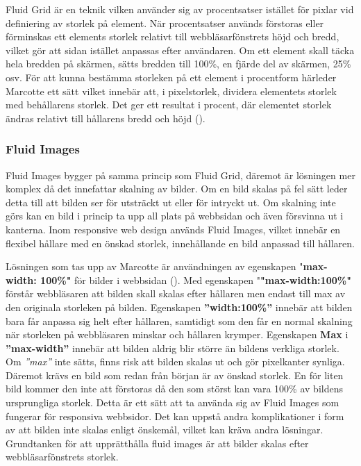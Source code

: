 \documentclass[11pt]{article}
\begin{document}
Fluid Grid är en teknik vilken använder sig av procentsatser istället för pixlar vid definiering av storlek på element. När procentsatser används förstoras eller förminskas ett elements storlek relativt till webbläsarfönstrets höjd och bredd, vilket gör att sidan istället anpassas efter användaren. Om ett element skall täcka hela bredden på skärmen, sätts bredden till 100\%, en fjärde del av skärmen, 25\% osv. 
För att kunna bestämma storleken på ett element i procentform härleder Marcotte ett sätt vilket innebär att, i pixelstorlek, dividera elementets storlek med behållarens storlek. Det ger ett resultat i procent, där elementet storlek ändras relativt till hållarens bredd och höjd (\cite[s. 23]{resp}).

\subsubsection{Fluid Images}
Fluid Images bygger på samma princip som Fluid Grid, däremot är lösningen mer komplex då det innefattar skalning av bilder. Om en bild skalas på fel sätt leder detta till att bilden ser för utsträckt ut eller för intryckt ut. Om skalning inte görs kan en bild i princip ta upp all plats på webbsidan och även försvinna ut i kanterna. Inom responsive web design används Fluid Images, vilket innebär en flexibel hållare med en önskad storlek, innehållande en bild anpassad till hållaren.  

Lösningen som tas upp av Marcotte är användningen av egenskapen "\textbf{max-width: 100\%"} för bilder i webbsidan (\cite[s. 45]{resp}). Med egenskapen "\textbf{"max-width:100\%"}  förstår webbläsaren att bilden skall skalas efter hållaren men endast till max av den originala storleken på bilden. Egenskapen \textbf{”width:100\%”} innebär att bilden bara får anpassa sig helt efter hållaren, samtidigt som den får en normal skalning när storleken på webbläsaren minskar och hållaren krymper. Egenskapen \textbf{Max} i \textbf{”max-width”} innebär att bilden aldrig blir större än bildens verkliga storlek. Om \textit{”max”} inte sätts, finns risk att bilden skalas ut och gör pixelkanter synliga. Däremot krävs en bild som redan från början är av önskad storlek. En för liten bild kommer den inte att förstoras då den som störst kan vara 100\% av bildens ursprungliga storlek. Detta är ett sätt att ta använda sig av Fluid Images som fungerar för responsiva webbsidor. Det kan uppstå andra komplikationer i form av att bilden inte skalas enligt önskemål, vilket kan kräva andra lösningar. Grundtanken för att upprätthålla fluid images är att bilder skalas efter webbläsarfönstrets storlek.
\end{document}
